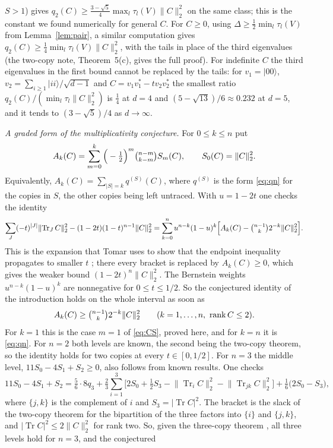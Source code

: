 \documentclass[11pt]{article}
\theoremstyle{remark}
\newcommand{\Tr}{\operatorname{Tr}}
\newcommand{\norm}[1]{\lVert #1\rVert}
\begin{document}
$S>1$) gives $q_2(C)\ge\frac{3-\sqrt5}4\max_l\tau_l(V)\norm{C}_2^2$ on the same class; this is the constant we found
numerically for general $C$. For $C\ge0$, using $\Delta\ge\frac12\min_l\tau_l(V)$ from Lemma~\ref{lem:pair}, a similar
computation gives $q_2(C)\ge\frac14\min_l\tau_l(V)\norm{C}_2^2$, with the tails in place of the third eigenvalues (the two-copy note, Theorem~5(c), gives the full proof). For
indefinite $C$ the third eigenvalues in the first bound cannot be replaced by the tails: for $v_1=|00\rangle$,
$v_2=\sum_{i\ge1}|ii\rangle/\sqrt{d-1}$ and $C=v_1v_1^*-tv_2v_2^*$ the smallest ratio $q_2(C)/(\min_l\tau_l\norm{C}_2^2)$
is $\frac14$ at $d=4$ and $(5-\sqrt{13})/6\approx0.232$ at $d=5$, and it tends to $(3-\sqrt5)/4$ as $d\to\infty$.

\emph{A graded form of the multiplicativity conjecture.} For $0\le k\le n$ put
\[
A_k(C)=\sum_{m=0}^{k}\Big(-\tfrac12\Big)^m\tbinom{n-m}{k-m}S_m(C),\qquad S_0(C)=\norm{C}_2^2 .
\]
Equivalently, $A_k(C)=\sum_{|S|=k}q^{(S)}(C)$, where $q^{(S)}$ is the form \eqref{eq:qn} for the copies in $S$, the
other copies being left untraced. With $u=1-2t$ one checks the identity
\[
\sum_J(-t)^{|J|}\norm{\Tr_JC}_2^2-(1-2t)(1-t)^{n-1}\norm{C}_2^2
=\sum_{k=0}^nu^{n-k}(1-u)^k\Big[A_k(C)-\tbinom{n-1}{k}2^{-k}\norm{C}_2^2\Big].
\]
This is the expansion that Tomar uses to show that the endpoint inequality propagates to smaller $t$
\cite[Lemma~2.3(b)]{Tomar}; there every bracket is replaced by $A_k(C)\ge0$, which gives the weaker bound
$(1-2t)^n\norm{C}_2^2$. The Bernstein weights $u^{n-k}(1-u)^k$ are nonnegative for $0\le t\le1/2$. So the conjectured
identity of the introduction holds on the whole interval as soon as
\[
A_k(C)\ge\tbinom{n-1}{k}2^{-k}\norm{C}_2^2\qquad(k=1,\dots,n,\ \operatorname{rank}C\le2).
\]
For $k=1$ this is the case $m=1$ of \eqref{eq:CS}, proved here, and for $k=n$ it is \eqref{eq:qn}. For $n=2$ both
levels are known, the second being the two-copy theorem, so the identity holds for two copies at every
$t\in[0,1/2]$. For $n=3$ the middle level, $11S_0-4S_1+S_2\ge0$, also follows from known results. One checks
\[
11S_0-4S_1+S_2=\tfrac56\cdot8q_3+\tfrac23\sum_{i=1}^3\Big[2S_0+\tfrac12S_3-\norm{\Tr_iC}_2^2-\norm{\Tr_{jk}C}_2^2\Big]
+\tfrac16\big(2S_0-S_3\big),
\]
where $\{j,k\}$ is the complement of $i$ and $S_3=|\Tr C|^2$. The bracket is the slack of the two-copy theorem
\cite{FHPV,BGH} for the bipartition of the three factors into $\{i\}$ and $\{j,k\}$, and $|\Tr C|^2\le2\norm{C}_2^2$
for rank two. So, given the three-copy theorem \cite{Tomar}, all three levels hold for $n=3$, and the conjectured
\end{document}
